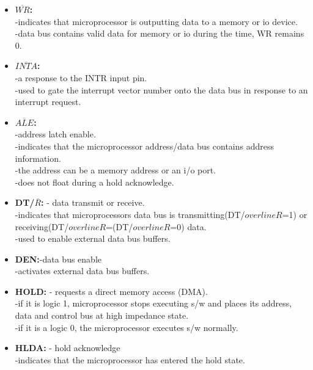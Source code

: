 \documentclass[12pt]{article}
\begin{document}
\begin{itemize}
\begin{itemize}
		\item \textbf{$\overline{WR}$:} \\
		-indicates that microprocessor is outputting data to a memory or io device.\\
		-data bus contains valid data for memory or io during the time, WR remains 0.\\
		
		\item \textbf{$\overline{INTA}$:} \\
		-a response to the INTR input pin.\\
		-used to gate the interrupt vector number onto the data bus in response to an interrupt request.\\
		
		\item \textbf{$\overline{ALE}$:} \\
		-address latch enable.\\
		-indicates that the microprocessor address/data bus contains address information.\\
		-the address can be a memory address or an i/o port.\\
		-does not float during a hold acknowledge.\\
		
		\item\textbf{DT/$\overline{R}$:} - data transmit or receive.\\
		-indicates that microprocessors data bus is transmitting(DT/$overline{R}$=1) or receiving(DT/$overline{R}$=(DT/$overline{R}$=0) data.\\
		-used to enable external data bus buffers.\\
		
		\item\textbf{DEN:}-data bus enable\\
		-activates external data bus buffers.\\
		
		\item\textbf{HOLD:} - requests a direct memory access (DMA).\\
		-if it is logic 1, microprocessor stops executing s/w and places its address, data and control bus at high impedance state.\\
		-if it is a logic 0, the microprocessor executes s/w normally.\\
		
		\item\textbf{HLDA:} - hold acknowledge\\
		-indicates that the microprocessor has entered the hold state.\\
		

\end{itemize}
\end{itemize}
\end{document}
